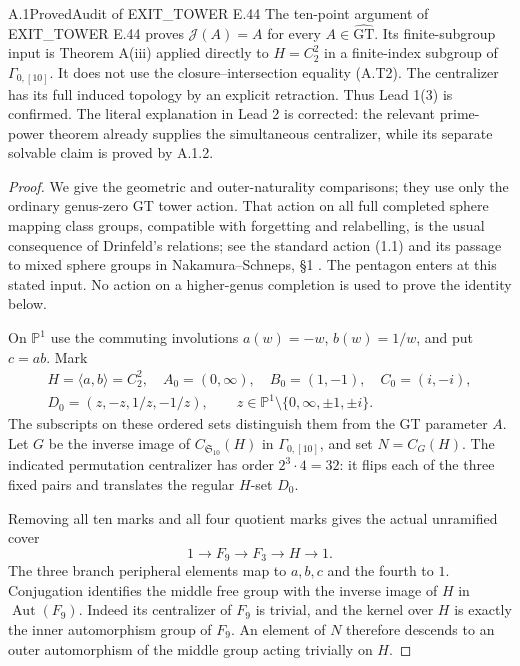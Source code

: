 \begin{result}{A.1}{Proved}{Audit of EXIT\_TOWER E.44}
The ten-point argument of EXIT\_TOWER E.44 proves
$\mathcal J(A)=A$ for every $A\in\widehat{\mathrm{GT}}$.
Its finite-subgroup input is Theorem A(iii) applied directly to
$H=C_2^2$ in a finite-index subgroup of $\Gamma_{0,[10]}$.
It does not use the closure--intersection equality (A.T2).
The centralizer has its full induced topology by an explicit
retraction.  Thus Lead 1(3) is confirmed.  The literal explanation
in Lead 2 is corrected: the relevant prime-power theorem already
supplies the simultaneous centralizer, while its separate solvable
claim is proved by A.1.2.
\end{result}
\begin{proof}
We give the geometric and outer-naturality comparisons; they use
only the ordinary genus-zero GT tower action.  That action on all
full completed sphere mapping class groups, compatible with
forgetting and relabelling, is the usual consequence of Drinfeld's
relations; see the standard action (1.1) and its passage to mixed
sphere groups in Nakamura--Schneps, \S1 \cite{CA_NS2000}.
The pentagon enters at this stated input.  No action on
a higher-genus completion is used to prove the identity below.

On $\mathbb P^1$ use the commuting involutions
$a(w)=-w$, $b(w)=1/w$, and put $c=ab$.  Mark
\[
\begin{gathered}
 H=\langle a,b\rangle=C_2^2,\quad
 A_0=(0,\infty),\quad B_0=(1,-1),\quad C_0=(i,-i),\\
 D_0=(z,-z,1/z,-1/z),\qquad
 z\in\mathbb P^1\setminus\{0,\infty,\pm1,\pm i\}.
\end{gathered}                                                \tag{A.T10}
\]
The subscripts on these ordered sets distinguish them from the GT
parameter $A$.  Let $G$ be the inverse image of
$C_{\mathfrak S_{10}}(H)$ in $\Gamma_{0,[10]}$, and set
$N=C_G(H)$.  The indicated permutation centralizer has order
$2^3\cdot4=32$: it flips each of the three fixed pairs and
translates the regular $H$-set $D_0$.

Removing all ten marks and all four quotient marks gives the
actual unramified cover
\[
 1\longrightarrow F_9\longrightarrow F_3
       \longrightarrow H\longrightarrow1.                 \tag{A.T11}
\]
The three branch peripheral elements map to $a,b,c$ and the
fourth to $1$.  Conjugation identifies the middle free group
with the inverse image of $H$ in $\operatorname{Aut}(F_9)$.
Indeed its centralizer of $F_9$ is trivial, and the kernel over
$H$ is exactly the inner automorphism group of $F_9$.
An element of $N$ therefore descends to an outer automorphism
of the middle group acting trivially on $H$.


\end{proof}
